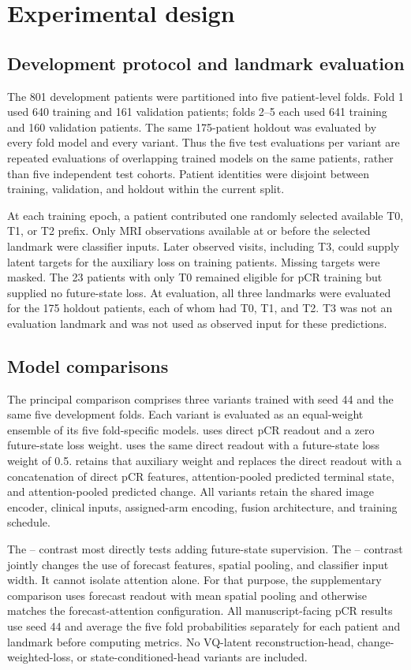 \section{Experimental design}
\label{sec:experiments}
\subsection{Development protocol and landmark evaluation}
The 801 development patients were partitioned into five patient-level folds. Fold 1 used 640 training and 161 validation patients; folds 2--5 each used 641 training and 160 validation patients. The same 175-patient holdout was evaluated by every fold model and every variant. Thus the five test evaluations per variant are repeated evaluations of overlapping trained models on the same patients, rather than five independent test cohorts. Patient identities were disjoint between training, validation, and holdout within the current split.

At each training epoch, a patient contributed one randomly selected available T0, T1, or T2 prefix. Only MRI observations available at or before the selected landmark were classifier inputs. Later observed visits, including T3, could supply latent targets for the auxiliary loss on training patients. Missing targets were masked. The 23 patients with only T0 remained eligible for pCR training but supplied no future-state loss. At evaluation, all three landmarks were evaluated for the 175 holdout patients, each of whom had T0, T1, and T2. T3 was not an evaluation landmark and was not used as observed input for these predictions.

\subsection{Model comparisons}
The principal comparison comprises three variants trained with seed 44 and the same five development folds. Each variant is evaluated as an equal-weight ensemble of its five fold-specific models. \nojepa{} uses direct pCR readout and a zero future-state loss weight. \direct{} uses the same direct readout with a future-state loss weight of 0.5. \fullmodel{} retains that auxiliary weight and replaces the direct readout with a concatenation of direct pCR features, attention-pooled predicted terminal state, and attention-pooled predicted change. All variants retain the shared image encoder, clinical inputs, assigned-arm encoding, fusion architecture, and training schedule.

The \direct{}--\nojepa{} contrast most directly tests adding future-state supervision. The \fullmodel{}--\direct{} contrast jointly changes the use of forecast features, spatial pooling, and classifier input width. It cannot isolate attention alone. For that purpose, the supplementary \meanmodel{} comparison uses forecast readout with mean spatial pooling and otherwise matches the forecast-attention configuration. All manuscript-facing pCR results use seed 44 and average the five fold probabilities separately for each patient and landmark before computing metrics. No VQ-latent reconstruction-head, change-weighted-loss, or state-conditioned-head variants are included.

